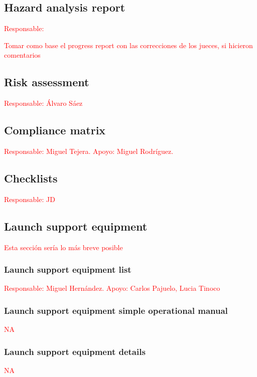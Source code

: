 \documentclass[11pt, a4paper]{article} %
\begin{document}
\subsection{Hazard analysis report} \textcolor{red}{Responsable: }

\vspace{1cm}

\textcolor{red}{Tomar como base el progress report con las correcciones de los jueces, si hicieron comentarios}

\subsection{Risk assessment} \textcolor{red}{Responsable: Álvaro Sáez}

\subsection{Compliance matrix} \textcolor{red}{Responsable: Miguel Tejera. Apoyo: Miguel Rodríguez.}

\subsection{Checklists} \textcolor{red}{Responsable: JD}

\subsection{Launch support equipment} \textcolor{red}{Esta sección sería lo más breve posible}
\subsubsection{Launch support equipment list} \textcolor{red}{Responsable: Miguel Hernández. Apoyo: Carlos Pajuelo, Lucia Tinoco}

\subsubsection{Launch support equipment simple operational manual} \textcolor{red}{ NA}
\subsubsection{Launch support equipment details} \textcolor{red}{NA}
\end{document}
